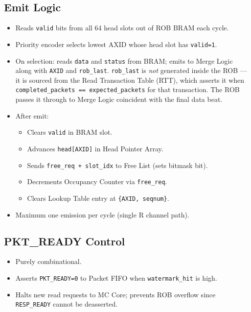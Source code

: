 \subsection{Emit Logic}
\begin{itemize}[noitemsep]
  \item Reads \texttt{valid} bits from all 64 head slots out of ROB BRAM each cycle.
  \item Priority encoder selects lowest AXID whose head slot has \texttt{valid=1}.
  \item On selection: reads \texttt{data} and \texttt{status} from BRAM; emits to Merge Logic
        along with \texttt{AXID} and \texttt{rob\_last}. \texttt{rob\_last} is \emph{not}
        generated inside the ROB — it is sourced from the Read Transaction Table (RTT), which
        asserts it when \texttt{completed\_packets == expected\_packets} for that transaction.
        The ROB passes it through to Merge Logic coincident with the final data beat.
  \item After emit:
    \begin{itemize}[noitemsep]
      \item Clears \texttt{valid} in BRAM slot.
      \item Advances \texttt{head[AXID]} in Head Pointer Array.
      \item Sends \texttt{free\_req + slot\_idx} to Free List (sets bitmask bit).
      \item Decrements Occupancy Counter via \texttt{free\_req}.
      \item Clears Lookup Table entry at \texttt{\{AXID, seqnum\}}.
    \end{itemize}
  \item Maximum one emission per cycle (single R channel path).
\end{itemize}

\subsection{PKT\_READY Control}
\begin{itemize}[noitemsep]
  \item Purely combinational.
  \item Asserts \texttt{PKT\_READY=0} to Packet FIFO when \texttt{watermark\_hit} is high.
  \item Halts new read requests to MC Core; prevents ROB overflow since \texttt{RESP\_READY} cannot be deasserted.
\end{itemize}

